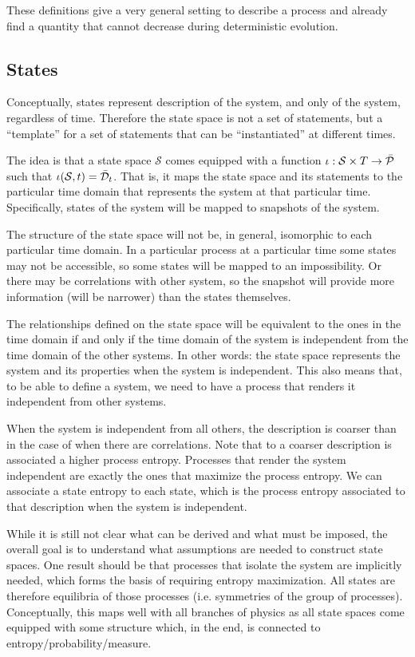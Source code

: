 \documentclass[11pt,letterpaper,fleqn]{memoir} %
\begin{document}
These definitions give a very general setting to describe a process and already find a quantity that cannot decrease during deterministic evolution.

\subsection{States}

Conceptually, states represent description of the system, and only of the system, regardless of time. Therefore the state space is not a set of statements, but a ``template'' for a set of statements that can be ``instantiated'' at different times.

The idea is that a state space $\mathcal{S}$ comes equipped with a function $\iota : \mathcal{S} \times T \to \tdomain[P]$ such that $\iota(\mathcal{S}, t) = \tdomain_t$. That is, it maps the state space and its statements to the particular time domain that represents the system at that particular time. Specifically, states of the system will be mapped to snapshots of the system.

The structure of the state space will not be, in general, isomorphic to each particular time domain. In a particular process at a particular time some states may not be accessible, so some states will be mapped to an impossibility. Or there may be correlations with other system, so the snapshot will provide more information (will be narrower) than the states themselves.

The relationships defined on the state space will be equivalent to the ones in the time domain if and only if the time domain of the system is independent from the time domain of the other systems. In other words: the state space represents the system and its properties when the system is independent. This also means that, to be able to define a system, we need to have a process that renders it independent from other systems.

When the system is independent from all others, the description is coarser than in the case of when there are correlations. Note that to a coarser description is associated a higher process entropy. Processes that render the system independent are exactly the ones that maximize the process entropy. We can associate a state entropy to each state, which is the process entropy associated to that description when the system is independent.

While it is still not clear what can be derived and what must be imposed, the overall goal is to understand what assumptions are needed to construct state spaces. One result should be that processes that isolate the system are implicitly needed, which forms the basis of requiring entropy maximization. All states are therefore equilibria of those processes (i.e. symmetries of the group of processes). Conceptually, this maps well with all branches of physics as all state spaces come equipped with some structure which, in the end, is connected to entropy/probability/measure.
\end{document}

